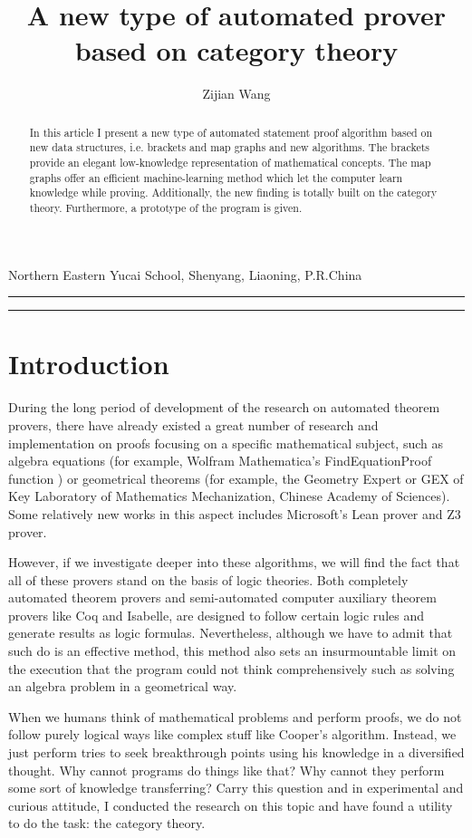 \documentclass{article}
\begin{document}
\title{A new type of automated prover based on category theory}
\author{Zijian Wang}
\date{}
\maketitle

\begin{center}
Northern Eastern Yucai School, Shenyang, Liaoning, P.R.China
\end{center}

\hrule
\begin{abstract}
In this article I present a new type of automated statement proof algorithm based on new data structures, i.e. brackets and map graphs
and new algorithms. The brackets provide an elegant low-knowledge representation of mathematical concepts. The map graphs offer an efficient machine-learning method which let the computer learn knowledge while proving. Additionally, the new finding is totally built on the category theory. Furthermore, a prototype of the program is given.
\end{abstract}
\hrule

\section*{Introduction}
During the long period of development of the research on automated theorem provers, there have already existed a great number of research and implementation on proofs focusing on a specific mathematical subject, such as algebra equations (for example, Wolfram Mathematica{'}s FindEquationProof function \cite{2}) or geometrical theorems (for example, the Geometry Expert or GEX \cite{3} of Key Laboratory of Mathematics Mechanization, Chinese Academy of Sciences). Some relatively new works in this aspect includes Microsoft{'}s Lean prover and Z3 prover.

However, if we investigate deeper into these algorithms, we will find the fact that all of these provers stand on the basis of logic theories. Both completely automated theorem provers and semi-automated computer auxiliary theorem provers like Coq and Isabelle, are designed to follow certain logic rules and generate results as logic formulas. Nevertheless, although we have to admit that such do is an effective method, this method also sets an insurmountable limit on the execution that the program could not think comprehensively such as solving an algebra problem in a geometrical way.

When we humans think of mathematical problems and perform proofs, we do not follow purely logical ways like complex stuff like Cooper{'}s algorithm. Instead, we just perform tries to seek breakthrough points using his knowledge in a diversified thought. Why cannot programs do things like that? Why cannot they perform some sort of knowledge transferring? Carry this question and in experimental and curious attitude, I conducted the research on this topic and have found a utility to do the task: the category theory.
\end{document}
